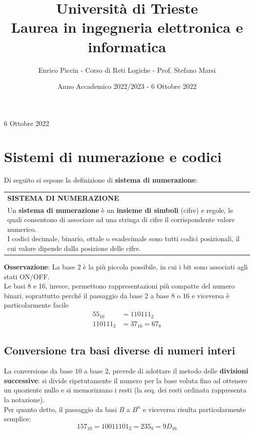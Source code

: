 \documentclass[a4paper]{extarticle}
\title{\textbf{Università di Trieste\\ \vspace{1em}
Laurea in ingegneria elettronica e informatica}}
\author{Enrico Piccin - Corso di Reti Logiche - Prof. Stefano Marsi}
\date{Anno Accademico 2022/2023 - 6 Ottobre 2022}
\renewcommand\arraystretch{}
\begin{document}
\vspace{-10mm}
\maketitle

\tableofcontents
\newpage
\begin{center}
    6 Ottobre 2022
\end{center}

\vspace{1em}
\noindent
\section{Sistemi di numerazione e codici}
Di seguito si espone la definizione di \textbf{sistema di numerazione}:

\vspace{1em}
\setlength{\tabcolsep}{14pt}
\renewcommand{\arraystretch}{2}
\noindent
\begin{tabularx}{\textwidth}{@{}|P|@{}}
    \hline
    {\textbf{SISTEMA DI NUMERAZIONE}}\\
    \parbox{\linewidth}{Un \textbf{sistema di numerazione} è un \textbf{insieme di simboli} (cifre) e regole, le quali consentono di associare ad una stringa di cifre il corrispondente valore numerico.\\
    I codici decimale, binario, ottale o esadecimale sono tutti codici posizionali, il cui valore dipende dalla posizione delle cifre.\vspace{3mm}}\\
    \hline
\end{tabularx}

\vspace{2em}
\noindent
\textbf{Osservazione}: La base $2$ è la più piccola possibile, in cui i bit sono associati agli stati ON/OFF.\\
Le basi 8 e 16, invece, permettono rappresentazioni più compatte del numero binari, soprattutto perché il passaggio da base 2 a base 8 o 16 e viceversa è particolarmente facile
\begin{align}
    55_10 & = 110111_2\\
    110111_2 & = 37_16 = 67_8
\end{align}

\vspace{1em}
\noindent
\subsection{Conversione tra basi diverse di numeri interi}
La conversione da base $10$ a base $2$, prevede di adottare il metodo delle \textbf{divisioni successive}: si divide ripetutamente il numero per la base voluta fino ad ottenere un quoziente nullo e si memorizzano i resti (la seq. dei resti ordinata rappresenta la notazione).\\
Per quanto detto, il passaggio da basi $B$ a $B^n$ e viceversa risulta particolarmente semplice:
\[157_10=10011101_2=235_8=9D_16\]
\end{document}
